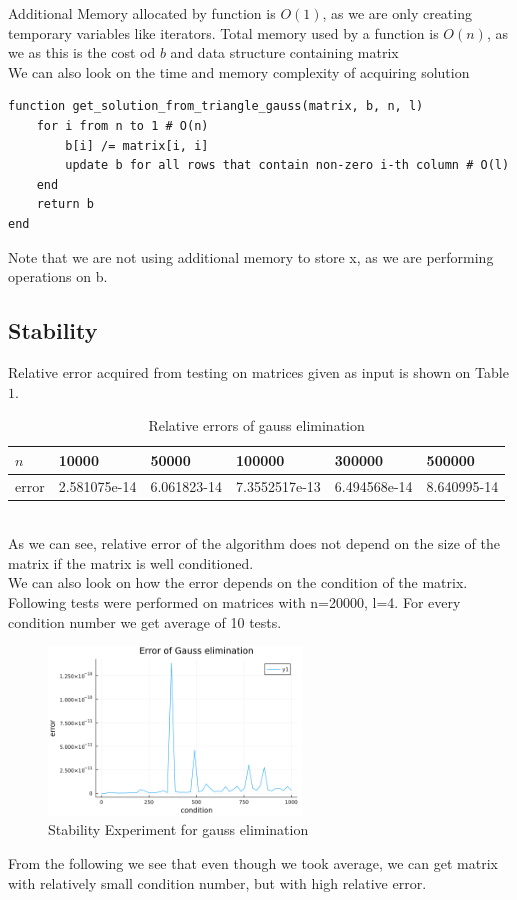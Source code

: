 \documentclass[11pt]{article}
\begin{document}
Additional Memory allocated by function is $O(1)$, as we are only creating temporary variables like iterators.
Total memory used by a function is $O(n)$, as we as this is the cost od $b$ and data structure containing matrix
\\
We can also look on the time and memory complexity of acquiring solution
\begin{lstlisting}
function get_solution_from_triangle_gauss(matrix, b, n, l)
    for i from n to 1 # O(n)
        b[i] /= matrix[i, i]     
        update b for all rows that contain non-zero i-th column # O(l)
    end
    return b
end
\end{lstlisting}
Note that we are not using additional memory to store x, as we are performing operations on b. 
\subsection*{Stability}
Relative error acquired from testing on matrices given as input is shown on Table $1$.
\begin{table}[!ht]
    \centering
    \begin{tabular}{|l|l|l|l|l|l|}
    \hline
        $n$ & 10000 & 50000 & 100000 & 300000 & 500000 \\ \hline
        error & 2.581075e-14 & 6.061823-14 & 7.3552517e-13 & 6.494568e-14 & 8.640995-14 \\ \hline
    \end{tabular}
    \caption{Relative errors of gauss elimination}
\end{table}
\\
As we can see, relative error of the algorithm does not depend on the size of the matrix if the matrix is well conditioned.
\\We can also look on how the error depends on the condition of the matrix.
Following tests were performed on matrices with n=20000, l=4. For every condition number we get average of 10 tests.
\begin{figure}[h]
    \centering
    \includegraphics[width=0.6\textwidth]{gauss_error.png}
    \caption{Stability Experiment for gauss elimination}
\end{figure}
From the following we see that even though we took average, we can get matrix with relatively small condition number, but with high relative error.
\end{document}

